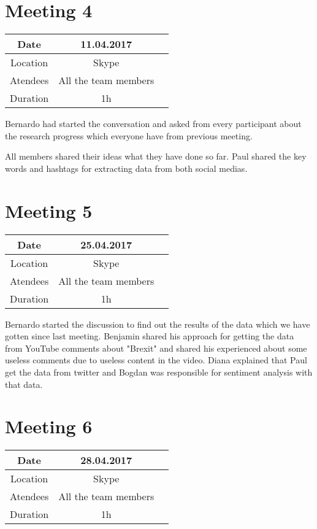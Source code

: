 \section{Meeting 4}
\begin{center}
	\begin{tabular}{| c | c | c }
		\hline
		Date & 	11.04.2017   \\
		\hline
		Location & Skype  \\
		\hline
		Atendees & All the team members   \\
		\hline
		Duration & 1h  \\
		\hline
	\end{tabular}
\end{center}
Bernardo had started the conversation and asked from every
participant about the research progress which everyone have
from previous meeting.

All members shared their ideas what they have done so far.
Paul shared the key words and hashtags for extracting data
from both social medias.

\section{Meeting 5}
\begin{center}
	\begin{tabular}{| c | c | c }
		\hline
		Date & 	25.04.2017   \\
		\hline
		Location & Skype  \\
		\hline
		Atendees & All the team members   \\
		\hline
		Duration & 1h  \\
		\hline
	\end{tabular}
\end{center}


Bernardo started the discussion to find out the results of the
data which we have gotten since last meeting. Benjamin
shared his approach for getting the data from YouTube
comments about "Brexit" and shared his experienced about
some useless comments due to useless content in the video.
Diana explained that Paul get the data from twitter and
Bogdan was responsible for sentiment analysis with that data.

\section{Meeting 6}
\begin{center}
	\begin{tabular}{| c | c | c }
		\hline
		Date & 	28.04.2017   \\
		\hline
		Location & Skype  \\
		\hline
		Atendees & All the team members   \\
		\hline
		Duration & 1h  \\
		\hline
	\end{tabular}
\end{center}


